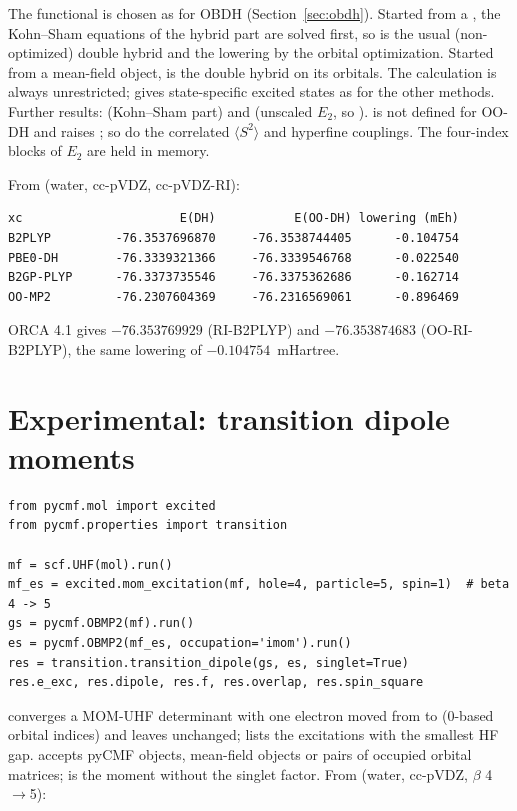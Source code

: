 The functional is chosen as for OBDH (Section~\ref{sec:obdh}). Started from a
, the Kohn--Sham equations of the hybrid part are solved first, so
 is the usual (non-optimized) double hybrid and
 the lowering by the orbital optimization. Started from a
mean-field object,  is the double hybrid on its orbitals. The
calculation is always unrestricted;  gives
state-specific excited states as for the other methods. Further results:
 (Kohn--Sham part) and  (unscaled $E_2$, so
).  is not defined for
OO-DH and raises ; so do the correlated
$\langle S^2\rangle$ and hyperfine couplings. The four-index blocks of $E_2$
are held in memory.

From  (water, cc-pVDZ, cc-pVDZ-RI):

\begin{lstlisting}[style=output]
xc                      E(DH)           E(OO-DH) lowering (mEh)
B2PLYP         -76.3537696870     -76.3538744405      -0.104754
PBE0-DH        -76.3339321366     -76.3339546768      -0.022540
B2GP-PLYP      -76.3373735546     -76.3375362686      -0.162714
OO-MP2         -76.2307604369     -76.2316569061      -0.896469
\end{lstlisting}

ORCA 4.1 gives $-76.353769929$ (RI-B2PLYP) and $-76.353874683$
(OO-RI-B2PLYP), the same lowering of $-0.104754$~mHartree.

\section{Experimental: transition dipole moments}
\label{sec:transition}

\begin{lstlisting}[style=python]
from pycmf.mol import excited
from pycmf.properties import transition

mf = scf.UHF(mol).run()
mf_es = excited.mom_excitation(mf, hole=4, particle=5, spin=1)  # beta 4 -> 5
gs = pycmf.OBMP2(mf).run()
es = pycmf.OBMP2(mf_es, occupation='imom').run()
res = transition.transition_dipole(gs, es, singlet=True)
res.e_exc, res.dipole, res.f, res.overlap, res.spin_square
\end{lstlisting}

 converges a MOM-UHF determinant with one electron moved
from  to  (0-based orbital indices) and leaves
 unchanged;  lists the 
excitations with the smallest HF gap.  accepts pyCMF
objects, \pyscf{} mean-field objects or pairs of occupied orbital matrices;
 is the moment without the singlet factor. From
 (water, cc-pVDZ,
$\beta$ 4$\to$5):

